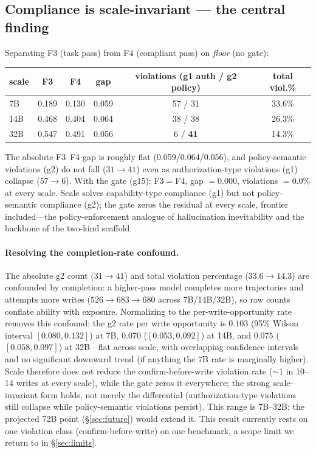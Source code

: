 \documentclass[10pt]{article}
\begin{document}
\subsection{Compliance is scale-invariant --- the central finding}\label{sec:compliance}
Separating F3 (task pass) from F4 (compliant pass) on \emph{floor} (no gate):
\begin{center}\small\begin{tabular}{lccccc}
\toprule scale & F3 & F4 & gap & violations (g1 auth / g2 policy) & total viol.\% \\ \midrule
7B  & 0.189 & 0.130 & 0.059 & 57 / 31 & 33.6\% \\
14B & 0.468 & 0.404 & 0.064 & 38 / 38 & 26.3\% \\
32B & 0.547 & 0.491 & 0.056 & 6 / \textbf{41} & 14.3\% \\ \bottomrule
\end{tabular}\end{center}
The absolute F3--F4 gap is roughly flat (0.059/0.064/0.056), and policy-semantic violations (g2) do not fall ($31\to41$) even as authorization-type violations (g1) collapse ($57\to6$). With the gate (g15): F3${=}$F4, gap ${=}0.000$, violations ${=}0.0\%$ at every scale. Scale solves capability-type compliance (g1) but not policy-semantic compliance (g2); the gate zeros the residual at every scale, frontier included---the policy-enforcement analogue of hallucination inevitability and the backbone of the two-kind scaffold.

\paragraph{Resolving the completion-rate confound.} The absolute g2 count ($31\to41$) and total violation percentage ($33.6\to14.3$) are confounded by completion: a higher-pass model completes more trajectories and attempts more writes ($526\to683\to680$ across 7B/14B/32B), so raw counts conflate ability with exposure. Normalizing to the per-write-opportunity rate removes this confound: the g2 rate per write opportunity is $0.103$ (95\% Wilson interval $[0.080,0.132]$) at 7B, $0.070$ ($[0.053,0.092]$) at 14B, and $0.075$ ($[0.058,0.097]$) at 32B---flat across scale, with overlapping confidence intervals and no significant downward trend (if anything the 7B rate is marginally higher). Scale therefore does not reduce the confirm-before-write violation rate ($\sim$1 in 10--14 writes at every scale), while the gate zeros it everywhere; the strong scale-invariant form holds, not merely the differential (authorization-type violations still collapse while policy-semantic violations persist). This range is 7B--32B; the projected 72B point (\S\ref{sec:future}) would extend it. This result currently rests on one violation class (confirm-before-write) on one benchmark, a scope limit we return to in \S\ref{sec:limits}.
\end{document}
